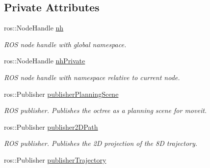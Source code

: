 \subsection*{Private Attributes}
\begin{DoxyCompactItemize}
\item 
\hypertarget{classSquirrelMotionPlanner_1_1Planner_a0f757a7ba2b25eee89f7634cee9c7553}{ros\-::\-Node\-Handle \hyperlink{classSquirrelMotionPlanner_1_1Planner_a0f757a7ba2b25eee89f7634cee9c7553}{nh}}\label{classSquirrelMotionPlanner_1_1Planner_a0f757a7ba2b25eee89f7634cee9c7553}

\begin{DoxyCompactList}\small\item\em R\-O\-S node handle with global namespace. \end{DoxyCompactList}\item 
\hypertarget{classSquirrelMotionPlanner_1_1Planner_a5fcf87fc35090bbfc889362e14be5cfe}{ros\-::\-Node\-Handle \hyperlink{classSquirrelMotionPlanner_1_1Planner_a5fcf87fc35090bbfc889362e14be5cfe}{nh\-Private}}\label{classSquirrelMotionPlanner_1_1Planner_a5fcf87fc35090bbfc889362e14be5cfe}

\begin{DoxyCompactList}\small\item\em R\-O\-S node handle with namespace relative to current node. \end{DoxyCompactList}\item 
\hypertarget{classSquirrelMotionPlanner_1_1Planner_aeed82573cd001be6ddf2cbabd7539491}{ros\-::\-Publisher \hyperlink{classSquirrelMotionPlanner_1_1Planner_aeed82573cd001be6ddf2cbabd7539491}{publisher\-Planning\-Scene}}\label{classSquirrelMotionPlanner_1_1Planner_aeed82573cd001be6ddf2cbabd7539491}

\begin{DoxyCompactList}\small\item\em R\-O\-S publisher. Publishes the octree as a planning scene for moveit. \end{DoxyCompactList}\item 
\hypertarget{classSquirrelMotionPlanner_1_1Planner_a23f7e2cf37f33a9ea98404b194ccb279}{ros\-::\-Publisher \hyperlink{classSquirrelMotionPlanner_1_1Planner_a23f7e2cf37f33a9ea98404b194ccb279}{publisher2\-D\-Path}}\label{classSquirrelMotionPlanner_1_1Planner_a23f7e2cf37f33a9ea98404b194ccb279}

\begin{DoxyCompactList}\small\item\em R\-O\-S publisher. Publishes the 2\-D projection of the 8\-D trajectory. \end{DoxyCompactList}\item 
\hypertarget{classSquirrelMotionPlanner_1_1Planner_aaaab0174414dd693a0227d90da18636e}{ros\-::\-Publisher \hyperlink{classSquirrelMotionPlanner_1_1Planner_aaaab0174414dd693a0227d90da18636e}{publisher\-Trajectory}}\label{classSquirrelMotionPlanner_1_1Planner_aaaab0174414dd693a0227d90da18636e}


\end{DoxyCompactItemize}

